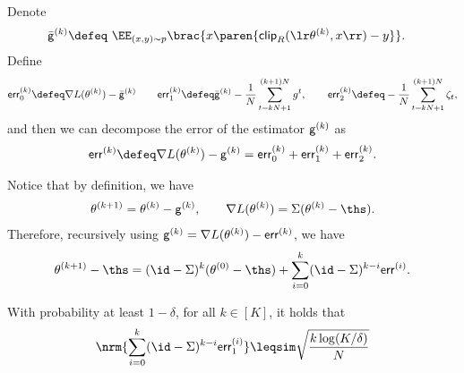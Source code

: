 \newcommand{\err}[1]{\mathsf{err}^{(#1)}}
Denote
\begin{align*}
    \ogd{k}\defeq&~ \EE_{(x,y)\sim p}\brac{ x\paren{ \clip_R(\lr \pa{k},x \rr)-y }}.
\end{align*}
Define
\begin{align*}
    \err{k}_0\defeq \nabla L(\pa{k})-\ogd{k} \qquad
    \err{k}_1\defeq \ogd{k}-\avgtk g^t, \qquad
    \err{k}_2\defeq -\avgtk \nt,
\end{align*}
and then we can decompose the error of the estimator $\mathsf{g}^{(k)}$ as
\begin{align*}
    \err{k}\defeq \nabla L(\pa{k}) - \gd{k} = \err{k}_0 + \err{k}_1 + \err{k}_2.
\end{align*}

Notice that by definition, we have
\begin{align*}
    \pa{k+1}=\pa{k}-\gd{k}, \qquad
    \nabla L(\pa{k})=\Sigma(\pa{k}-\ths).
\end{align*}
Therefore, recursively using $\gd{k}=\nabla L(\pa{k})-\err{k}$, we have
\begin{align*}
    \pa{k+1}-\ths=(\id-\Sigma)^k(\pa{0}-\ths)+\sum_{i=0}^{k} (\id-\Sigma)^{k-i}\err{i}.
\end{align*}

\begin{lemma}
With probability at least $1-\delta$, for all $k\in[K]$, it holds that
\begin{align*}
    \nrm{ \sum_{i=0}^{k} (\id-\Sigma)^{k-i}\err{i}_1 }\leqsim \sqrt{\frac{k\log(K/\delta)}{N}}
\end{align*}
\end{lemma}
